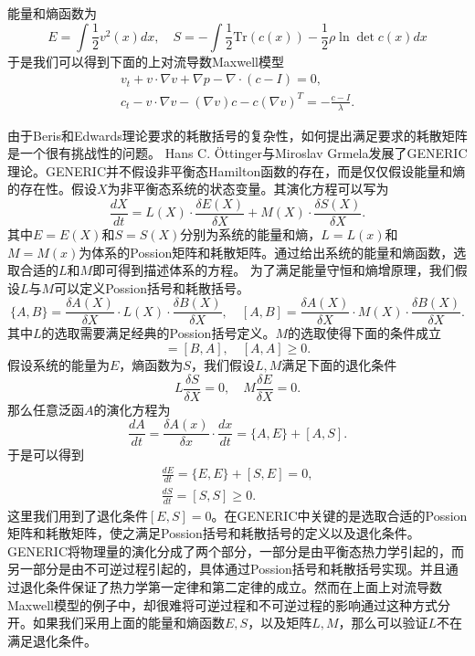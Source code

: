 \documentclass{article}
\begin{document}
能量和熵函数为
\begin{equation*}
	E = \int \frac{1}{2} v^2(x)dx, \quad S = -\int \frac{1}{2} \mbox{
 	Tr}(c(x))- \frac{1}{2} \rho \ln \det c(x) dx
\end{equation*}
于是我们可以得到下面的上对流导数Maxwell模型
\begin{eqnarray*}
	v_t + v \cdot \nabla v + \nabla p  - \nabla \cdot (c - I) = 0, \\
	c_t - v \cdot \nabla v - (\nabla v)c - c (\nabla v)^T = -\frac{c-I}{\lambda}.
\end{eqnarray*}

由于Beris和Edwards理论要求的耗散括号的复杂性，如何提出满足要求的耗散矩阵是一个很有挑战性的问题。
 Hans C. \"Ottinger与Miroslav Grmela发展了GENERIC理论。GENERIC并不假设非平衡态Hamilton函数的存在，而是仅仅假设能量和熵的存在性。假设$X$为非平衡态系统的状态变量。其演化方程可以写为
\begin{equation*}
	\frac{dX}{dt} = L(X) \cdot \frac{\delta E(X)}{\delta X} + M(X) \cdot \frac{\delta S(X)}{\delta X} .
\end{equation*}
其中$E=E(X)$和$S=S(X)$分别为系统的能量和熵，$L=L(x)$和$M=M(x)$为体系的Possion矩阵和耗散矩阵。通过给出系统的能量和熵函数，选取合适的$L$和$M$即可得到描述体系的方程。 为了满足能量守恒和熵增原理，我们假设$L$与$M$可以定义Possion括号和耗散括号。
\begin{equation*}
	\{ A,B \} = \frac{\delta A(X)}{\delta X} \cdot L(X) \cdot \frac{\delta B(X)}{\delta X}, \quad  [ A,B ] = \frac{\delta A(X)}{\delta X} \cdot M(X) \cdot \frac{\delta B(X)}{\delta X}. 
\end{equation*}
其中$L$的选取需要满足经典的Possion括号定义。$M$的选取使得下面的条件成立
\begin{equation*}
	[A,B] = [B,A], \quad [A,A] \ge 0.
\end{equation*}
假设系统的能量为$E$，熵函数为$S$，我们假设$L,M$满足下面的退化条件
\begin{equation}
	L \frac{\delta S}{\delta X} = 0, \quad M \frac{\delta E}{\delta X} = 0.
\end{equation}
那么任意泛函$A$的演化方程为
 \begin{equation*}
	\frac{d A}{dt} = \frac{\delta A(x)}{\delta x} \cdot \frac{dx}{dt} = \{ A,E\} + [A,S].
\end{equation*}
于是可以得到
\begin{eqnarray*}
	\frac{d E}{dt} = \{E,E\} +[S,E] = 0, \\
	\frac{d S}{dt} = [S,S] \ge 0. 
\end{eqnarray*}
这里我们用到了退化条件$[E,S] = 0$。在GENERIC中关键的是选取合适的Possion矩阵和耗散矩阵，使之满足Possion括号和耗散括号的定义以及退化条件。GENERIC将物理量的演化分成了两个部分，一部分是由平衡态热力学引起的，而另一部分是由不可逆过程引起的，具体通过Possion括号和耗散括号实现。并且通过退化条件保证了热力学第一定律和第二定律的成立。然而在上面上对流导数Maxwell模型的例子中，却很难将可逆过程和不可逆过程的影响通过这种方式分开。如果我们采用上面的能量和熵函数$E,S$，以及矩阵$L,M$，那么可以验证$L$不在满足退化条件。  
\end{document}
